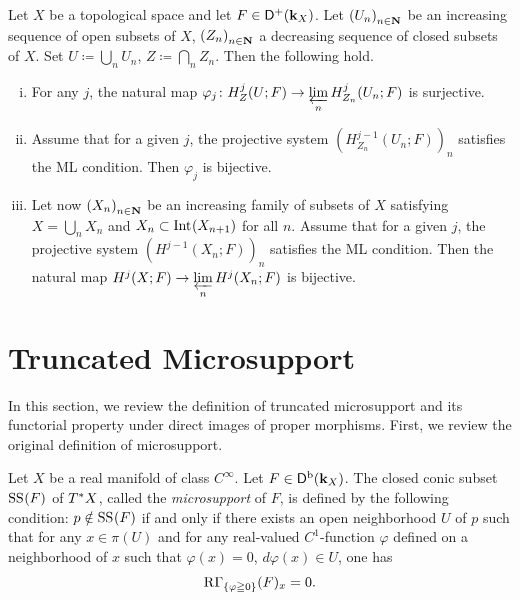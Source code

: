 \begin{Proposition+}[{\cite[Proposition 2.7.1]{KS90}}]\label{prop:ks2.7.1}
  Let \(X\) be a topological space and let \(F\in\Dompl(\kk_X)\). 
  Let \(\left(U_n\right)_{n\in\nn}\) be an increasing sequence 
  of open subsets of \(X\), \(\left(Z_n\right)_{n\in\nn}\) 
  a decreasing sequence of closed subsets of \(X\). 
  Set \(U\coloneqq\bigcup_{n}U_{n}\), 
  \(Z\coloneqq\bigcap_{n}Z_{n}\). 
  Then the following hold.
  \begin{enumerate}[(i)]
    \item \label{item:ks2.7.1.1} For any \(j\), the natural map \(
      \varphi_j\colon H^{j}_{Z}(U;F)
      \to 
      \prolim[n]H^{j}_{Z_{n}}(U_{n};F)
    \) is surjective. 
    \item \label{item:ks2.7.1.2} Assume that for a given \(j\), 
    the projective system \(
      (H^{j-1}_{Z_{n}}(U_{n};F))_{n}
    \) satisfies the ML condition. 
    Then \(\varphi_{j}\) is bijective. 
    \item \label{item:ks2.7.1.3} Let now \(\left(X_{n}\right)_{n\in\nn}\) be 
    an increasing family of subsets of \(X\) satisfying \(
      X=\bigcup_{n}X_n\) and \(X_{n}\subset \Int[](X_{n+1})
    \) for all \(n\). 
    Assume that for a given \(j\), the projective system \(
      \left(H^{j-1}(X_{n};F)\right)_{n}
    \) satisfies the ML condition. 
    Then the natural map \(
      H^{j}(X;F)\to \prolim[n]H^{j}(X_{n};F)
    \) is bijective. 
  \end{enumerate}
\end{Proposition+}

\section{Truncated Microsupport}\label{sec:t-ss}

In this section, we review 
the definition of truncated microsupport 
and 
its functorial property under direct images of 
proper morphisms. 
First, we review the original definition 
of microsupport. 
\begin{Definition+}[{\cite[Definition 5.1.2]{KS90}}]\label{dfn:ss}
  Let \(X\) be a real manifold of class \(C^{\infty}\).
  Let \(F\in\Dompb(\kk_X)\). 
  The closed conic subset \(\muS[](F)\) of \(\cotb[X]\), 
  called the \textit{microsupport} of \(F\),
  is defined by the following condition: \(p\notin \muS[](F)\) 
  if and only if 
  there exists an open neighborhood \(U\) of \(p\) 
  such that for any \(x\in \pi(U)\) and 
  for any real-valued \(C^{1}\)-function \(\varphi\) 
  defined on a neighborhood of \(x\) such that 
  \(\varphi(x)=0\), \(d\varphi(x)\in U\), 
  one has \begin{equation}
    \RG_{\{\varphi\geqq0\}}(F)_x=0.
  \end{equation}
\end{Definition+}

